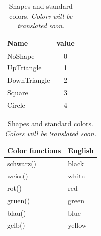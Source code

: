 \documentclass[12pt,letterpaper]{article}
\begin{document}
\begin{table}
\begin{center}
\begin{tabular}{|l|c|}
\hline
Name & value\\
\hline
NoShape      &0\\
UpTriangle   &1\\
DownTriangle &2\\
Square       &3\\
Circle       &4\\
\hline
\end{tabular}\hspace{5ex}
\begin{tabular}{|l|l|}
\hline
Color functions& English\\
\hline
schwarz() & black \\
weiss()   & white \\
rot()     & red   \\
gruen()   & green \\
blau()    & blue  \\
gelb()    & yellow\\
\hline
\end{tabular}
\end{center}
\caption{Shapes and standard colors. \textit{Colors will be translated soon.}}
\label{ShapeAndColor}
\end{table}
\end{document}
